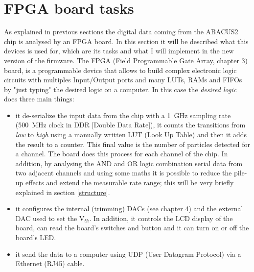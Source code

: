 \section{FPGA board tasks}
\noindent As explained in previous sections the digital data coming from the ABACUS2 chip is analysed by an FPGA board. In this section it will be described what this devices is used for, which are its tasks and what I will implement in the new version of the firmware.
The FPGA (Field Programmable Gate Array, chapter 3) board, is a programmable device that allows to build complex electronic logic circuits with multiples Input/Output ports and many LUTs, RAMs and FIFOs by "just typing" the desired logic on a computer.
In this case the \textit{desired logic} does three main things: 
\begin{itemize}
	\item it de-serialize the input data from the chip with a 1~GHz sampling rate (500~MHz clock in DDR [Double Data Rate]), it counts the transitions from \textit{low} to \textit{high} using a manually written LUT (Look Up Table) and then it adds the result to a counter. This final value is the number of particles detected for a channel. The board does this process for each channel of the chip. In addition, by analysing the AND and OR logic combination serial data from two adjacent channels and using some maths it is possible to reduce the pile-up effects and extend the measurable rate range; this will be very briefly explained in section \ref{structure}.    
	\item it configures the internal (trimming) DACs (see chapter 4) and the external DAC used to set the V$_{th}$. In addition, it controls the LCD display of the board, can read the board's switches and button and it can turn on or off the board's LED. 
	\item it send the data to a computer using UDP (User Datagram Protocol) via a Ethernet (RJ45) cable.  
\end{itemize}
















